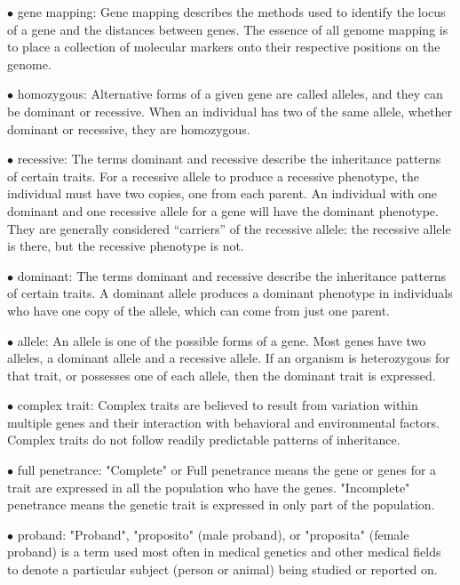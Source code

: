 \documentclass{article}
\begin{document}
\vspace{0.1in}
$\bullet$ gene mapping: 
Gene mapping describes the methods used to identify the locus of a gene and the distances between genes. The essence of all genome mapping is to place a collection of molecular markers onto their respective positions on the genome. 


\vspace{0.1in}
$\bullet$ homozygous:
Alternative forms of a given gene are called alleles, and they can be dominant or recessive. When an individual has two of the same allele, whether dominant or recessive, they are homozygous.


\vspace{0.1in}
$\bullet$ recessive:
 The terms dominant and recessive describe the inheritance patterns of certain traits. For a recessive allele to produce a recessive phenotype, the individual must have two copies, one from each parent. An individual with one dominant and one recessive allele for a gene will have the dominant phenotype. They are generally considered “carriers” of the recessive allele: the recessive allele is there, but the recessive phenotype is not.


\vspace{0.1in}
$\bullet$ dominant:
The terms dominant and recessive describe the inheritance patterns of certain traits. A dominant allele produces a dominant phenotype in individuals who have one copy of the allele, which can come from just one parent.


\vspace{0.1in}
$\bullet$ allele:
An allele is one of the possible forms of a gene. Most genes have two alleles, a dominant allele and a recessive allele. If an organism is heterozygous for that trait, or possesses one of each allele, then the dominant trait is expressed.


\vspace{0.1in}
$\bullet$ complex trait:
Complex traits are believed to result from variation within multiple genes and their interaction with behavioral and environmental factors. Complex traits do not follow readily predictable patterns of inheritance.


\vspace{0.1in}
$\bullet$ full penetrance:
 "Complete" or Full penetrance means the gene or genes for a trait are expressed in all the population who have the genes. "Incomplete" penetrance means the genetic trait is expressed in only part of the population.


\vspace{0.1in}
$\bullet$ proband:
"Proband", "proposito" (male proband), or "proposita" (female proband) is a term used most often in medical genetics and other medical fields to denote a particular subject (person or animal) being studied or reported on.
\end{document}
